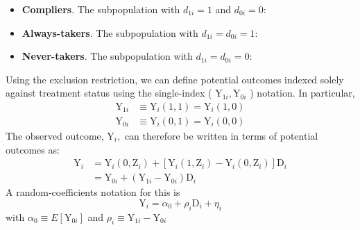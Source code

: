 \documentclass[
]{article}
\providecommand{\tightlist}{%
  \setlength{\itemsep}{0pt}\setlength{\parskip}{0pt}}
\begin{document}
\begin{itemize}
\tightlist
\item
  \textbf{Compliers}. The subpopulation with \(d_{1i} = 1\) and
  \(d_{0i} = 0\):
\item
  \textbf{Always-takers}. The subpopulation with \(d_{1i} =d_{0i} = 1\):
\item
  \textbf{Never-takers}. The subpopulation with \(d_{1i} =d_{0i} = 0\):
\end{itemize}

Using the exclusion restriction, we can define potential outcomes
indexed solely against treatment status using the single-index (
\(\mathrm{Y}_{1 i}, \mathrm{Y}_{0 i}\) ) notation. In particular, \[
\begin{aligned}
\mathrm{Y}_{1 i} & \equiv \mathrm{Y}_{i}(1,1)=\mathrm{Y}_{i}(1,0) \\
\mathrm{Y}_{0 i} & \equiv \mathrm{Y}_{i}(0,1)=\mathrm{Y}_{i}(0,0)
\end{aligned}
\] The observed outcome, \(\mathrm{Y}_{i},\) can therefore be written in
terms of potential outcomes as: \[
\begin{aligned}
\mathrm{Y}_{i} &=\mathrm{Y}_{i}\left(0, \mathrm{Z}_{i}\right)+\left[\mathrm{Y}_{i}\left(1, \mathrm{Z}_{i}\right)-\mathrm{Y}_{i}\left(0, \mathrm{Z}_{i}\right)\right] \mathrm{D}_{i} \\
&=\mathrm{Y}_{0 i}+\left(\mathrm{Y}_{1 i}-\mathrm{Y}_{0 i}\right) \mathrm{D}_{i}
\end{aligned} \] A random-coefficients notation for this is \[
\mathrm{Y}_{i}=\alpha_{0}+\rho_{i} \mathrm{D}_{i}+\eta_{i}
\] with \(\alpha_{0} \equiv E\left[\mathrm{Y}_{0 i}\right]\) and
\(\rho_{i} \equiv \mathrm{Y}_{1 i}-\mathrm{Y}_{0 i}\)
\end{document}
